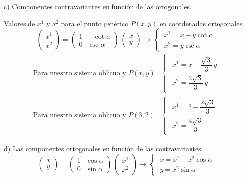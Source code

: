 \noindent
c) Componentes contravariantes en función de las ortogonales.

Valores de $x^1$ y $x^2$ para el punto genérico $P(x,y)$ en coordenadas ortogonales
\[
  \begin{pmatrix}
    x^1\\
    x^2
  \end{pmatrix}
  =
  \begin{pmatrix}
    1 & -\cot\alpha\\
    0 & \csc\alpha
  \end{pmatrix}
  \,\begin{pmatrix}
    x\\
    y
  \end{pmatrix}
  \longrightarrow
  \begin{cases}
    \begin{array}{l}
      x^1 = x-y\cot\alpha\\
      x^2 = y\csc\alpha
    \end{array}
  \end{cases}
\]
\[
  \begin{array}{ll}
  \text{Para nuestro sistema oblicuo y } P(x,y)&
  \begin{cases}
    \begin{array}{l}
      x^1 = x-\dfrac{\sqrt{3}}{3}\,y\\
      x^2 = \dfrac{2\sqrt{3}}{3}\,y
    \end{array}
  \end{cases}\\
  \text{Para nuestro sistema oblicuo y } P(3,2)&
  \begin{cases}
    \begin{array}{l}
      x^1 = 3-\dfrac{2\sqrt{3}}{3}\\
      x^2 = \dfrac{4\sqrt{3}}{3}
    \end{array}
  \end{cases}
  \end{array}
\]

\noindent
d) Las componentes ortogonales en función de las contravariantes.\\
\[
  \begin{pmatrix}
    x\\
    y
  \end{pmatrix}
  =
  \begin{pmatrix}
    1 & \cos\alpha\\
    0 & \sin\alpha
  \end{pmatrix}
  \,\begin{pmatrix}
    x^1\\
    x^2
  \end{pmatrix}
  \longrightarrow
  \begin{cases}
    \begin{array}{l}
      x = x^1 + x^2\cos\alpha\\
      y = x^2\sin\alpha
    \end{array}
  \end{cases}
\]

